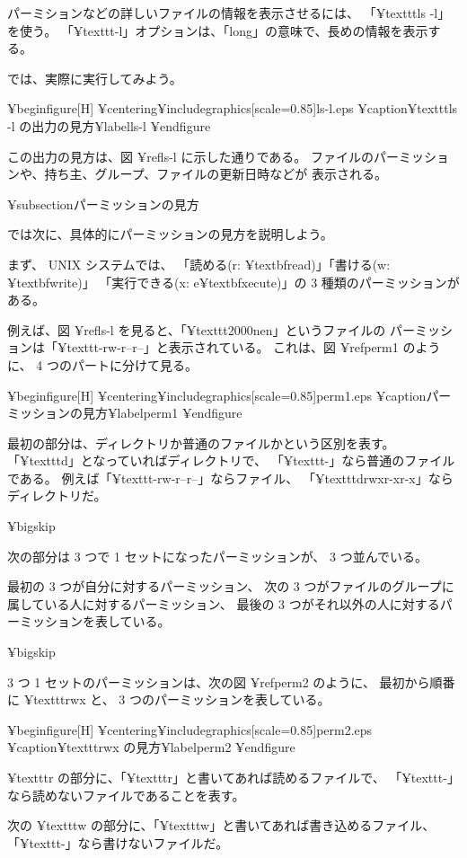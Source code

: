 パーミションなどの詳しいファイルの情報を表示させるには、
「¥texttt{ls -l}」を使う。
「¥texttt{-l}」オプションは、「long」の意味で、長めの情報を表示する。

では、実際に実行してみよう。

¥begin{figure}[H]
¥centering{¥includegraphics[scale=0.85]{ls-l.eps}}
¥caption{¥texttt{ls -l} の出力の見方}¥label{ls-l}
¥end{figure}

この出力の見方は、図 ¥ref{ls-l} に示した通りである。
ファイルのパーミッションや、持ち主、グループ、ファイルの更新日時などが
表示される。

¥subsection{パーミッションの見方}

では次に、具体的にパーミッションの見方を説明しよう。

まず、 UNIX システムでは、
「読める(r: ¥textbf{r}ead)」「書ける(w: ¥textbf{w}rite)」
「実行できる(x: e¥textbf{x}ecute)」の
 3 種類のパーミッションがある。

例えば、図 ¥ref{ls-l} を見ると、「¥texttt{2000nen}」というファイルの
パーミッションは「¥texttt{-rw-r--r--}」と表示されている。
これは、図 ¥ref{perm1} のように、 4 つのパートに分けて見る。

¥begin{figure}[H]
¥centering{¥includegraphics[scale=0.85]{perm1.eps}}
¥caption{パーミッションの見方}¥label{perm1}
¥end{figure}

最初の部分は、ディレクトリか普通のファイルかという区別を表す。
「¥texttt{d}」となっていればディレクトリで、
「¥texttt{-}」なら普通のファイルである。
例えば「¥texttt{-rw-r--r--}」ならファイル、
「¥texttt{drwxr-xr-x}」ならディレクトリだ。

¥bigskip

次の部分は 3 つで 1 セットになったパーミッションが、 3 つ並んでいる。

最初の 3 つが自分に対するパーミッション、
次の 3 つがファイルのグループに属している人に対するパーミッション、
最後の 3 つがそれ以外の人に対するパーミッションを表している。

¥bigskip

 3 つ 1 セットのパーミッションは、次の図 ¥ref{perm2} のように、
最初から順番に ¥texttt{rwx} と、 3 つのパーミッションを表している。

¥begin{figure}[H]
¥centering{¥includegraphics[scale=0.85]{perm2.eps}}
¥caption{¥texttt{rwx} の見方}¥label{perm2}
¥end{figure}

 ¥texttt{r} の部分に、「¥texttt{r}」と書いてあれば読めるファイルで、
「¥texttt{-}」なら読めないファイルであることを表す。

次の ¥texttt{w} の部分に、「¥texttt{w}」と書いてあれば書き込めるファイル、
「¥texttt{-}」なら書けないファイルだ。

